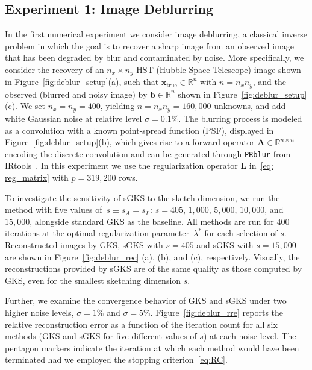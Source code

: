 \documentclass[%
  a4paper,
  onecolumn,
  colorlinks,
]{preprint}
\theoremstyle{plain}
\theoremstyle{definition}
\newcommand{\R}{\ensuremath{\mathbb{R}}}
\newcommand{\bA}{\ensuremath{\boldsymbol{A}}}
\newcommand{\bL}{\ensuremath{\boldsymbol{L}}}
\newcommand{\bb}{\mathbf{b}}
\newcommand{\bx}{\mathbf{x}}
\begin{document}
\subsection{Experiment 1: Image Deblurring}\label{sec:deblur}

In the first numerical experiment we consider image deblurring, a classical inverse problem in which the goal is to
recover a sharp image from an observed image that has been degraded by
blur and contaminated by noise.
More specifically, we consider the recovery of an $n_x \times n_y$ HST (Hubble Space
Telescope) image shown in Figure~\ref{fig:deblur_setup}(a), such that
$\bx_{\mathrm{true}} \in \R^n$ with $n = n_x n_y$, and the observed
(blurred and noisy image) by $\bb \in \R^n$ shown in Figure~\ref{fig:deblur_setup}(c). We set $n_x = n_y = 400$, yielding $n = n_x n_y = 160{,}000$ unknowns, and add
white Gaussian noise at relative level $\sigma = 0.1\%$.
The blurring process is modeled as a convolution with a known
point-spread function (PSF), displayed in Figure~\ref{fig:deblur_setup}(b), which gives rise to a forward operator
$\bA \in \R^{n \times n}$ encoding the discrete convolution and can be generated through \texttt{PRblur} from IRtools~\cite{GazzolaNagyPer19}.
In this experiment we use the regularization operator $\bL$ in~\eqref{eq: reg_matrix} with $p=319,200$ rows.

To investigate the sensitivity of sGKS to the sketch dimension, we run
the method with five values of~$s\equiv s_A=s_L$:
$s = 405$, $1{,}000$, $5{,}000$, $10{,}000$, and $15{,}000$,
alongside standard GKS as the baseline.
All methods are run for $400$ iterations at the optimal regularization
parameter~$\lambda^*$ for each selection of $s$. Reconstructed images by GKS, sGKS with $s=405$ and sGKS with $s= 15,000$ are shown in Figure~\ref{fig:deblur_rec} (a), (b), and (c), respectively. Visually, the reconstructions provided by sGKS are of the same quality as those computed by GKS, even for the smallest sketching dimension $s$.

Further, we examine the convergence behavior of GKS and sGKS under two higher noise levels,
$\sigma = 1\%$ and $\sigma = 5\%$.
Figure~\ref{fig:deblur_rre} reports the relative reconstruction error
as a function of the iteration count for all six methods (GKS and sGKS for five different values of $s$) at each noise
level.
The pentagon markers indicate the iteration at which each method would
have been terminated had we employed the stopping criterion~\eqref{eq:RC}. 
\end{document}
